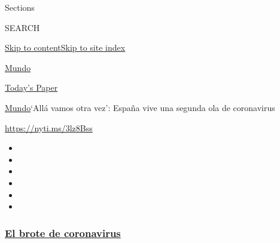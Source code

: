 Sections

SEARCH

\protect\hyperlink{site-content}{Skip to
content}\protect\hyperlink{site-index}{Skip to site index}

\href{https://www.nytimes3xbfgragh.onion/es/section/mundo}{Mundo}

\href{https://myaccount.nytimes3xbfgragh.onion/auth/login?response_type=cookie\&client_id=vi}{}

\href{https://www.nytimes3xbfgragh.onion/section/todayspaper}{Today's
Paper}

\href{/es/section/mundo}{Mundo}\textbar{}`Allá vamos otra vez': España
vive una segunda ola de coronavirus

\url{https://nyti.ms/3lz8Bss}

\begin{itemize}
\item
\item
\item
\item
\item
\item
\end{itemize}

\hypertarget{el-brote-de-coronavirus}{%
\subsubsection{\texorpdfstring{\href{https://www.nytimes3xbfgragh.onion/es/spotlight/coronavirus?name=styln-coronavirus-es\&region=TOP_BANNER\&block=storyline_menu_recirc\&action=click\&pgtype=Article\&impression_id=17019080-f4c3-11ea-8e04-4768752866ed\&variant=undefined}{El
brote de
coronavirus}}{El brote de coronavirus}}\label{el-brote-de-coronavirus}}

